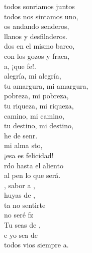 \begin{cancion}%
	 todos sonriamos juntos\\
	\jump
todos nos sintamos uno,\\
	os andando senderos,\\
	\jump
llanos y desfiladeros.\\
	dos en el mismo barco,\\
	con los gozos y fraca,\\
	a, ¡que fe!. \\
	\jump
	alegría, mi alegría,\\
	\jump
tu amargura, mi amargura,\\
	pobreza, mi pobreza,\\
	\jump
tu riqueza, mi riqueza,\\
	 camino, mi camino,\\
	tu destino, mi destino,\\
	he de senr.\\
	\jump
	mi alma sto,\\
	¡esa es felicidad!\\
	rdo hasta el aliento\\
	al pen lo que será.\\
	, sabor a ,\\
	 huyas de ,\\
	ta no sentirte\\
	no seré fz\\
	 Tu seas de ,\\
	e yo sea de \\
	 todos vios siempre a.\\
\end{cancion}%
